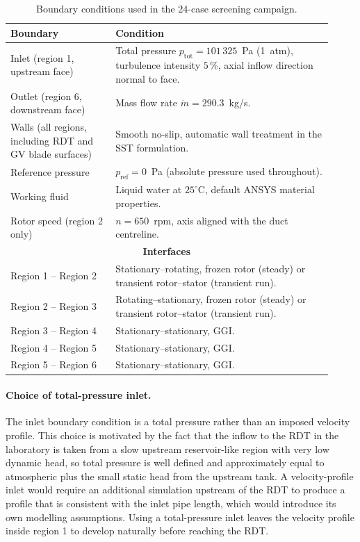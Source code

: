\begin{table}[h!]
  \centering
  \caption[Boundary conditions for the screening simulations]{Boundary conditions used in the 24-case screening campaign.}
  \label{tab:bc_master}
  \small
  \begin{tabular}{p{0.30\linewidth} p{0.62\linewidth}}
    \toprule
    \textbf{Boundary} & \textbf{Condition} \\
    \midrule
    Inlet (region 1, upstream face)
        & Total pressure $p_{\mathrm{tot}} = 101\,325$~Pa (1~atm),
          turbulence intensity $5\,\%$, axial inflow direction normal to face. \\
    Outlet (region 6, downstream face)
        & Mass flow rate $\dot m = 290.3$~kg/s. \\
    Walls (all regions, including RDT and GV blade surfaces)
        & Smooth no-slip, automatic wall treatment in the SST formulation. \\
    Reference pressure
        & $p_{\mathrm{ref}} = 0$~Pa (absolute pressure used throughout). \\
    Working fluid
        & Liquid water at $25^\circ$C, default ANSYS material properties. \\
    Rotor speed (region 2 only)
        & $n = 650$~rpm, axis aligned with the duct centreline. \\
    \midrule
    \multicolumn{2}{c}{\textbf{Interfaces}} \\
    \midrule
    Region 1 -- Region 2
        & Stationary--rotating, frozen rotor (steady) or transient rotor--stator (transient run). \\
    Region 2 -- Region 3
        & Rotating--stationary, frozen rotor (steady) or transient rotor--stator (transient run). \\
    Region 3 -- Region 4
        & Stationary--stationary, GGI. \\
    Region 4 -- Region 5
        & Stationary--stationary, GGI. \\
    Region 5 -- Region 6
        & Stationary--stationary, GGI. \\
    \bottomrule
  \end{tabular}
\end{table}
 
\paragraph{Choice of total-pressure inlet.}
The inlet boundary condition is a total pressure rather than an imposed velocity profile. This choice is motivated by the fact that the inflow to the RDT in the laboratory is taken from a slow upstream reservoir-like region with very low dynamic head, so total pressure is well defined and approximately equal to atmospheric plus the small static head from the upstream tank. A velocity-profile inlet would require an additional simulation upstream of the RDT to produce a profile that is consistent with the inlet pipe length, which would introduce its own modelling assumptions. Using a total-pressure inlet leaves the velocity profile inside region 1 to develop naturally before reaching the RDT.
 
